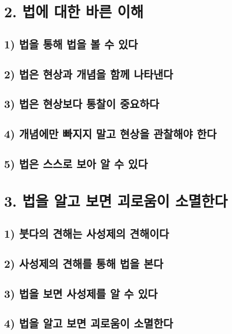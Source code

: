 \documentclass[12pt, a4paper, oneside]{book}
\begin{document}
	\newpage
	\chapter{2. 법에 대한 바른 이해}
	\section{1) 법을 통해 법을 볼 수 있다}
	\section{2) 법은 현상과 개념을 함께 나타낸다}
	\section{3) 법은 현상보다 통찰이 중요하다}
	\section{4) 개념에만 빠지지 말고 현상을 관찰해야 한다}
	\section{5) 법은 스스로 보아 알 수 있다}

	\newpage
	\chapter{3. 법을 알고 보면 괴로움이 소멸한다}
	\section{1) 붓다의 견해는 사성제의 견해이다}
	\section{2) 사성제의 견해를 통해 법을 본다}
	\section{3) 법을 보면 사성제를 알 수 있다}
	\section{4) 법을 알고 보면 괴로움이 소멸한다}



\end{document}
